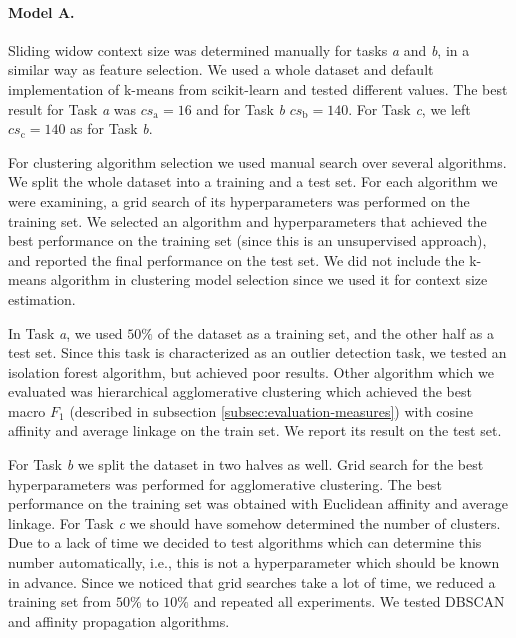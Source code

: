 \documentclass[10pt, a4paper]{article}
\begin{document}
\paragraph{Model A.} 
Sliding widow context size was determined manually for tasks \emph{a} and \emph{b}, in a similar way as feature selection. We used a whole dataset and default implementation of k-means from scikit-learn and tested different values. The best result for Task \emph{a} was $\mathit{cs}_\mathrm{a}=16$ and for Task \emph{b} $\mathit{cs}_\mathrm{b}=140$. For Task \emph{c}, we left $\mathit{cs}_\mathrm{c}=140$ as for Task \emph{b}.

For clustering algorithm selection we used manual search over several algorithms. We split the whole dataset into a training and a test set. For each algorithm we were examining, a grid search of its hyperparameters was performed on the training set. We selected an algorithm and hyperparameters that achieved the best performance on the training set (since this is an unsupervised approach), and reported the final performance on the test set. We did not include the k-means algorithm in clustering model selection since we used it for context size estimation.

In Task \emph{a}, we used $50\%$ of the dataset as a training set, and the other half as a test set. Since this task is characterized as an outlier detection task, we tested an isolation forest algorithm, but achieved poor results. Other algorithm which we evaluated was hierarchical agglomerative clustering which achieved the best macro $F_1$ (described in subsection \ref{subsec:evaluation-measures}) with cosine affinity and average linkage on the train set. We report its result on the test set.

For Task \emph{b} we split the dataset in two halves as well. Grid search for the best hyperparameters was performed for agglomerative clustering. The best performance on the training set was obtained with Euclidean affinity and average linkage. For Task \emph{c} we should have somehow determined the number of clusters. Due to a lack of time we decided to test algorithms which can determine this number automatically, i.e., this is not a hyperparameter which should be known in advance. Since we noticed that grid searches take a lot of time, we reduced a training set from $50\%$ to $10\%$ and repeated all experiments. We tested DBSCAN and affinity propagation algorithms.
\end{document}
